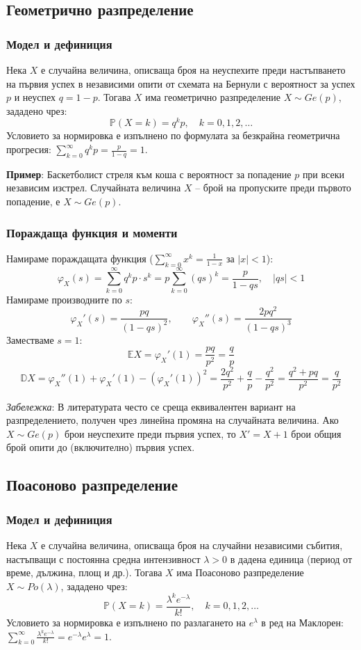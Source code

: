 \documentclass{scrartcl}
\begin{document}
\begin{FlushLeft}
\subsection{Геометрично разпределение}
\subsubsection{Модел и дефиниция}
Нека $X$ е случайна величина, описваща броя на неуспехите преди настъпването на първия успех в независими опити от схемата на Бернули с вероятност за успех $p$ и неуспех $q = 1 - p$. Тогава $X$ има геометрично разпределение $X \sim Ge(p)$, зададено чрез:
\[ \mathbb{P}(X = k) = q^k p, \quad k = 0, 1, 2, \dots \]
Условието за нормировка е изпълнено по формулата за безкрайна геометрична прогресия: $\sum_{k=0}^{\infty} q^k p = \frac{p}{1 - q} = 1$.

\textbf{Пример}: Баскетболист стреля към коша с вероятност за попадение $p$ при всеки независим изстрел. Случайната величина $X$ – брой на пропуските преди първото попадение, е $X \sim Ge(p)$.

\subsubsection{Пораждаща функция и моменти}
Намираме пораждащата функция ($\sum_{k=0}^{\infty} x^k = \frac{1}{1-x}$ за $|x| < 1$):
\[ \varphi_X(s) = \sum_{k=0}^{\infty} q^k p \cdot s^k = p \sum_{k=0}^{\infty} (qs)^k = \frac{p}{1 - qs}, \quad |qs| < 1 \]
Намираме производните по $s$:
\[ \varphi_X'(s) = \frac{pq}{(1 - qs)^2}, \qquad \varphi_X''(s) = \frac{2pq^2}{(1 - qs)^3} \]
Заместваме $s = 1$:
\[ \mathbb{E}X = \varphi_X'(1) = \frac{pq}{p^2} = \frac{q}{p} \]
\[ \mathbb{D}X = \varphi_X''(1) + \varphi_X'(1) - (\varphi_X'(1))^2 = \frac{2q^2}{p^2} + \frac{q}{p} - \frac{q^2}{p^2} = \frac{q^2 + pq}{p^2} = \frac{q}{p^2} \]

\textit{Забележка}: В литературата често се среща еквивалентен вариант на разпределението, получен чрез линейна промяна на случайната величина. Ако $X \sim Ge(p)$ брои неуспехите преди първия успех, то $X' = X + 1$ брои общия брой опити до (включително) първия успех.

\subsection{Поасоново разпределение}
\subsubsection{Модел и дефиниция}
Нека $X$ е случайна величина, описваща броя на случайни независими събития, настъпващи с постоянна средна интензивност $\lambda > 0$ в дадена единица (период от време, дължина, площ и др.). Тогава $X$ има Поасоново разпределение $X \sim Po(\lambda)$, зададено чрез:
\[ \mathbb{P}(X = k) = \frac{\lambda^k e^{-\lambda}}{k!}, \quad k = 0, 1, 2, \dots \]
Условието за нормировка е изпълнено по разлагането на $e^\lambda$ в ред на Маклорен: $\sum_{k=0}^{\infty} \frac{\lambda^k e^{-\lambda}}{k!} = e^{-\lambda} e^{\lambda} = 1$.


\end{FlushLeft}
\end{document}

